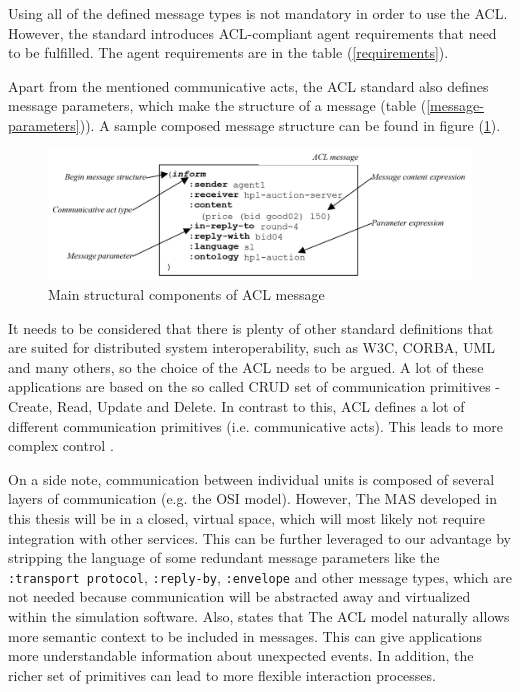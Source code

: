 \documentclass[main.tex]{subfiles}
\begin{document}
Using all of the defined message types is not mandatory in order to use the ACL.
However, the standard introduces ACL-compliant agent requirements that need to be fulfilled. The 
agent requirements are in the table (\ref{requirements}). 

Apart from the mentioned communicative acts, the ACL standard also defines message parameters, which
make the structure of a message (table (\ref{message-parameters})). A sample composed message structure can be found 
in figure (\ref{message-structure}).


\begin{figure}[htbp]
    \centering
    \includegraphics[width=.99\textwidth]{acl-message-structure.png}
    \caption{Main structural components of ACL message \cite{IntelligentPhysicalAgents2001}}
    \label{message-structure}
\end{figure}

It needs to be considered that there is plenty of other standard definitions that are suited for
distributed system interoperability, such as W3C, CORBA, UML and many others, so the choice 
of the ACL needs to be argued. A lot of these applications are based on the so called CRUD set of 
communication primitives - Create, Read, Update and Delete. In contrast to this, ACL defines a lot 
of different communication primitives (i.e. communicative acts). This leads to more complex control 
\cite{Poslad2007}. 

On a side note, communication between individual units is composed of several layers of communication 
(e.g. the OSI model). 
However, The MAS developed in this thesis will be in a closed, virtual space, which 
will most likely not require integration with other services. This can be further leveraged to our 
advantage by stripping the language of some redundant message parameters like the \texttt{:transport 
protocol}, \texttt{:reply-by}, \texttt{:envelope} and other message types, which are not needed
because communication will be abstracted away and virtualized within the simulation software. 
Also, \cite{Poslad2007} states that The ACL model naturally allows more semantic context
to be included in messages. This can give applications more understandable information about
unexpected events. In addition, the richer set of primitives can lead to more flexible
interaction processes.
\end{document}
